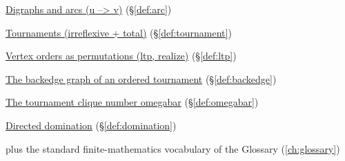 \begin{closurepanel}
\item \hyperref[def:arc]{Digraphs and arcs (u --> v)} (\S\ref*{def:arc})
\item \hyperref[def:tournament]{Tournaments (irreflexive + total)} (\S\ref*{def:tournament})
\item \hyperref[def:ltp]{Vertex orders as permutations (ltp, realize)} (\S\ref*{def:ltp})
\item \hyperref[def:backedge]{The backedge graph of an ordered tournament} (\S\ref*{def:backedge})
\item \hyperref[def:omegabar]{The tournament clique number omegabar} (\S\ref*{def:omegabar})
\item \hyperref[def:domination]{Directed domination} (\S\ref*{def:domination})
\item plus the standard finite-mathematics vocabulary of the Glossary (\cref{ch:glossary})
\end{closurepanel}
